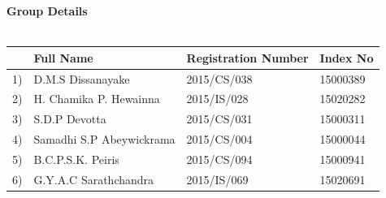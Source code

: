 \documentclass[a4paper,beamer]{article}
\begin{document}
		\textbf{Group Details}\\
		\vspace{1cm}\\	
				\bgroup
					\def\arraystretch{2}%
					\begin{tabular}{|p{.5cm}|p{5cm}|p{4cm}|p{3cm}|} \hline 
					  & \textbf{Full Name}  & \textbf{Registration Number} & \textbf{Index No } \\ \hline
					1) & D.M.S Dissanayake	 & 2015/CS/038 & 15000389\\ \hline
					2) & H. Chamika  P.  Hewainna & 2015/IS/028 & 15020282\\ \hline
					3) & S.D.P Devotta & 2015/CS/031 & 15000311\\ \hline
					4) & Samadhi S.P Abeywickrama & 2015/CS/004 & 15000044\\ \hline
					5) & B.C.P.S.K. Peiris	 & 2015/CS/094 & 15000941\\ \hline
					6) & G.Y.A.C Sarathchandra & 2015/IS/069 & 15020691\\ \hline
					\end{tabular} \\[.6cm]
				\egroup
	
\end{document}
